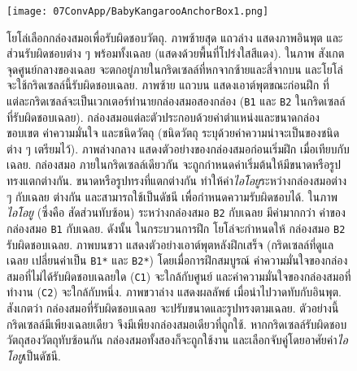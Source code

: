 
%
\begin{figure}
	\begin{center}
		\texttt{[image: 07ConvApp/BabyKangarooAnchorBox1.png]}
		\caption[โยโล่เลือกกล่องสมอเพื่อรับผิดชอบวัตถุ]{
			โยโล่เลือกกล่องสมอเพื่อรับผิดชอบวัตถุ.
			ภาพซ้ายสุด แถวล่าง แสดงภาพอินพุต และส่วนรับผิดชอบต่าง ๆ พร้อมทั้งเฉลย (แสดงด้วยพื้นที่โปร่งใสสีแดง).
			ในภาพ สังเกต จุดศูนย์กลางของเฉลย จะตกอยู่ภายในกริดเซลล์ที่หกจากซ้ายและสี่จากบน และโยโล่จะใช้กริดเซลล์นี้รับผิดชอบเฉลย.
			ภาพซ้าย แถวบน แสดงเอาต์พุตขณะก่อนฝึก ที่แต่ละกริดเซลล์จะเป็นเวกเตอร์ทำนายกล่องสมอสองกล่อง (\texttt{B1} และ \texttt{B2} ในกริดเซลล์ที่รับผิดชอบเฉลย).
			กล่องสมอแต่ละตัวประกอบด้วยค่าตำแหน่งและขนาดกล่องขอบเขต ค่าความมั่นใจ และชนิดวัตถุ (ชนิดวัตถุ ระบุด้วยค่าความน่าจะเป็นของชนิดต่าง ๆ เตรียมไว้).
			ภาพล่างกลาง แสดงตัวอย่างของกล่องสมอก่อนเริ่มฝึก เมื่อเทียบกับเฉลย.
			กล่องสมอ ภายในกริดเซลล์เดียวกัน จะถูกกำหนดค่าเริ่มต้นให้มีขนาดหรือรูปทรงแตกต่างกัน.
			ขนาดหรือรูปทรงที่แตกต่างกัน ทำให้ค่า\textit{ไอโอยู}ระหว่างกล่องสมอต่าง ๆ กับเฉลย ต่างกัน และสามารถใช้เป็นดัชนี เพื่อกำหนดความรับผิดชอบได้.
			ในภาพ \textit{ไอโอยู} (ซึ่งคือ สัดส่วนทับซ้อน) ระหว่างกล่องสมอ \texttt{B2} กับเฉลย มีค่ามากกว่า ค่าของกล่องสมอ \texttt{B1} กับเฉลย.
			ดังนั้น ในกระบวนการฝึก โยโล่จะกำหนดให้ กล่องสมอ \texttt{B2} รับผิดชอบเฉลย. 
			ภาพบนขวา แสดงตัวอย่างเอาต์พุตหลังฝึกเสร็จ (กริดเซลล์ที่ดูแลเฉลย เปลี่ยนค่าเป็น \texttt{B1*} และ \texttt{B2*})
			โดยเมื่อการฝึกสมบูรณ์ ค่าความมั่นใจของกล่องสมอที่ไม่ได้รับผิดชอบเฉลยใด (\texttt{C1}) จะใกล้กับศูนย์ 
			และค่าความมั่นใจของกล่องสมอที่ทำงาน (\texttt{C2}) จะใกล้กับหนึ่ง.
			ภาพขวาล่าง แสดงผลลัพธ์ เมื่อนำไปวาดทับกับอินพุต.
			สังเกตว่า กล่องสมอที่รับผิดชอบเฉลย จะปรับขนาดและรูปทรงตามเฉลย.
			ตัวอย่างนี้ กริดเซลล์มีเพียงเฉลยเดียว จึงมีเพียงกล่องสมอเดียวที่ถูกใช้.
			หากกริดเซลล์รับผิดชอบวัตถุสองวัตถุทับซ้อนกัน กล่องสมอทั้งสองก็จะถูกใช้งาน และเลือกจับคู่โดยอาศัยค่า\textit{ไอโอยู}เป็นดัชนี.
		}
		\label{fig: Yolo anchor boxes}
	\end{center}
\end{figure}
%

